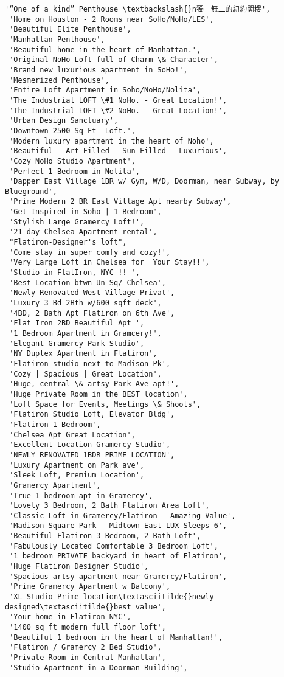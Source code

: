 \documentclass[11pt]{article}
\begin{document}
\begin{tcolorbox}[breakable, size=fbox, boxrule=.5pt, pad at break*=1mm, opacityfill=0]
\begin{Verbatim}[commandchars=\\\{\}]
 '“One of a kind” Penthouse \textbackslash{}n獨一無二的紐約閣樓',
 'Home on Houston - 2 Rooms near SoHo/NoHo/LES',
 'Beautiful Elite Penthouse',
 'Manhattan Penthouse',
 'Beautiful home in the heart of Manhattan.',
 'Original NoHo Loft full of Charm \& Character',
 'Brand new luxurious apartment in SoHo!',
 'Mesmerized Penthouse',
 'Entire Loft Apartment in Soho/NoHo/Nolita',
 'The Industrial LOFT \#1 NoHo. - Great Location!',
 'The Industrial LOFT \#2 NoHo. - Great Location!',
 'Urban Design Sanctuary',
 'Downtown 2500 Sq Ft  Loft.',
 'Modern luxury apartment in the heart of Noho',
 'Beautiful - Art Filled - Sun Filled - Luxurious',
 'Cozy NoHo Studio Apartment',
 'Perfect 1 Bedroom in Nolita',
 'Dapper East Village 1BR w/ Gym, W/D, Doorman, near Subway, by Blueground',
 'Prime Modern 2 BR East Village Apt nearby Subway',
 'Get Inspired in Soho | 1 Bedroom',
 'Stylish Large Gramercy Loft!',
 '21 day Chelsea Apartment rental',
 "Flatiron-Designer's loft",
 'Come stay in super comfy and cozy!',
 'Very Large Loft in Chelsea for  Your Stay!!',
 'Studio in FlatIron, NYC !! ',
 'Best Location btwn Un Sq/ Chelsea',
 'Newly Renovated West Village Privat',
 'Luxury 3 Bd 2Bth w/600 sqft deck',
 '4BD, 2 Bath Apt Flatiron on 6th Ave',
 'Flat Iron 2BD Beautiful Apt ',
 '1 Bedroom Apartment in Gramcery!',
 'Elegant Gramercy Park Studio',
 'NY Duplex Apartment in Flatiron',
 'Flatiron studio next to Madison Pk',
 'Cozy | Spacious | Great Location',
 'Huge, central \& artsy Park Ave apt!',
 'Huge Private Room in the BEST location',
 'Loft Space for Events, Meetings \& Shoots',
 'Flatiron Studio Loft, Elevator Bldg',
 'Flatiron 1 Bedroom',
 'Chelsea Apt Great Location',
 'Excellent Location Gramercy Studio',
 'NEWLY RENOVATED 1BDR PRIME LOCATION',
 'Luxury Apartment on Park ave',
 'Sleek Loft, Premium Location',
 'Gramercy Apartment',
 'True 1 bedroom apt in Gramercy',
 'Lovely 3 Bedroom, 2 Bath Flatiron Area Loft',
 'Classic Loft in Gramercy/Flatiron - Amazing Value',
 'Madison Square Park - Midtown East LUX Sleeps 6',
 'Beautiful Flatiron 3 Bedroom, 2 Bath Loft',
 'Fabulously Located Comfortable 3 Bedroom Loft',
 '1 bedroom PRIVATE backyard in heart of Flatiron',
 'Huge Flatiron Designer Studio',
 'Spacious artsy apartment near Gramercy/Flatiron',
 'Prime Gramercy Apartment w Balcony',
 'XL Studio Prime location\textasciitilde{}newly designed\textasciitilde{}best value',
 'Your home in Flatiron NYC',
 '1400 sq ft modern full floor loft',
 'Beautiful 1 bedroom in the heart of Manhattan!',
 'Flatiron / Gramercy 2 Bed Studio',
 'Private Room in Central Manhattan',
 'Studio Apartment in a Doorman Building',

\end{Verbatim}
\end{tcolorbox}
\end{document}
